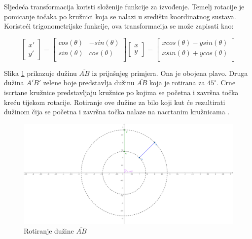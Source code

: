 \documentclass{foi}
\begin{document}
Sljedeća transformacija koristi složenije funkcije za izvođenje. Temelj rotacije je pomicanje točaka po kružnici koja se nalazi u središtu koordinatnog sustava. Koristeći trigonometrijske funkcije, ova transformacija se može zapisati kao:

\[
\begin{bmatrix}
x'\\
y' 
\end{bmatrix}
=
\begin{bmatrix}
cos(\theta) & -sin(\theta)\\
sin(\theta) & cos(\theta)\\
\end{bmatrix}
\begin{bmatrix}
x\\
y
\end{bmatrix}
=
\begin{bmatrix}
xcos(\theta)-ysin(\theta)\\
xsin(\theta)+ycos(\theta)\\
\end{bmatrix}
\]

Slika \ref{fig:Rotacija} prikazuje dužinu $\overline{AB}$ iz prijašnjeg primjera. Ona je obojena plavo. Druga dužina $\overline{A'B'}$ zelene boje predstavlja dužinu $\overline{AB}$ koja je rotirana za $45^{\circ}$. Crne iscrtane kružnice predstavljaju kružnice po kojima se početna i završna točka kreću tijekom rotacije. Rotiranje ove dužine za bilo koji kut će rezultirati dužinom čija se početna i završna točka nalaze na nacrtanim kružnicama \parencite{2DTransform}. 

\begin{figure}[H]
	\centering
	\includegraphics[width=1\textwidth,trim={3cm 0cm 3cm 0cm},clip]{slike/32_Rotiranje.png}
	\captionsetup{justification=centering}
	\caption{Rotiranje dužine $\overline{AB}$}
	\label{fig:Rotacija}
\end{figure}
\end{document}
